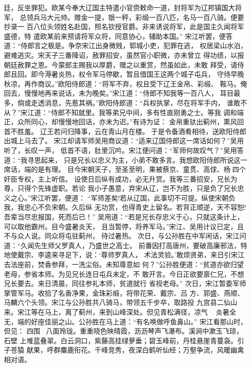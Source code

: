 廷，反坐罪犯。欧某今奉大辽国主特遣小官赍敕命一道，封将军为辽邦镇国大将军，
总领兵马大元帅。赠金一提，银一秤，彩缎一百八匹，名马一百八骑。便要抄录一
百八位头领姓名赴国，照名钦授官爵。非来诱说将军，此是国主久闻将军盛德，特
遣欧某前来预请将军众将，同意协心，辅助本国。”
宋江听罢，便答道：“侍郎言之极是。争奈宋江出身微贱，郓城小吏，犯罪在逃，
权居梁山水泊，避难逃灾。宋天子三番降诏，赦罪招安，虽然官小职微，亦未曾立
得功绩，以报朝廷赦罪之恩。今蒙郎主赐我以厚爵，赠之以重赏，然虽如此，未敢
拜受，请侍郎且回。即今溽暑炎热，权令军马停歇，暂且借国王这两个城子屯兵，
守待早晚秋凉，再作商议。”欧阳侍郎道：“将军不弃，权且受下辽王金帛、彩缎、
鞍马。俺回去，慢慢地再来说话，未为晚矣。”宋江道：“侍郎不知我等一百八人，
耳目最多，倘或走透消息，先惹其祸。”欧阳侍郎道：“兵权执掌，尽在将军手内，
谁敢不从？”宋江道：“侍郎不知就里。我等弟兄中间，多有性直刚勇之士。等我
调和端正，众所同心，却慢慢地回话，亦未为迟。”有诗为证：
金帛重驮出蓟州，熏风回首不胜羞。
辽王若问归降事，云在青山月在楼。
于是令备酒肴相待，送欧阳侍郎出城上马去了。
宋江却请军师吴用商议道：“适来辽国侍郎这一席话如何？”吴用听了，长叹一声，
低首不语，肚里沉吟。宋江便问道：“军师何故叹气？”吴用答道：“我寻思起来，
只是兄长以忠义为主，小弟不敢多言。我想欧阳侍郎所说这一席话，端的是有理。
目今宋朝天子，至圣至明，果被蔡京、童贯、高俅、杨四个奸臣专权，主上听信。
设使日后纵有成功，必无升赏。我等三番招安，兄长为尊，只得个先锋虚职。若论
我小子愚意，弃宋从辽，岂不为胜，只是负了兄长忠义之心。”宋江听罢，便道：
“军师差矣!若从辽国，此事切不可提。纵使宋朝负我，我忠心不负宋朝。久后纵
无功赏，也得青史上留名。若背正顺逆，天不容恕!吾辈当尽忠报国，死而后已！”
吴用道：“若是兄长存忠义于心，只就这条计上，可以取他霸州。目今盛暑炎天，
且当暂停，将养军马。”宋江、吴用计议已定，且不与众人说。同众将屯驻蓟州，
待过暑热。
次日，与公孙胜在中军闲话，宋江问道：“久闻先生师父罗真人，乃盛世之高士。
前番因打高唐州，要破高廉邪法，特地使戴宗、李逵来寻足下，说：‘尊师罗真人，
术法灵验。’敢烦贤弟，来日引宋江去法座前，焚香参拜，一洗尘俗。未知尊意如
何？”公孙胜便道：“贫道亦欲归望老母，参省本师。为见兄长连日屯兵未定，不
敢开言。今日正欲要禀仁兄，不想兄长要去。来日清晨，同往参礼本师，贫道就行
省视老母。”
次日，宋江暂委军师掌管军马。收拾了名香净果，金珠彩缎，将带花荣、戴宗、吕
方、郭盛、燕顺、马麟六个头领。宋江与公孙胜共八骑马，带领五千步卒，取路投
九宫县二仙山来。宋江等在马上，离了蓟州，来到山峰深处。但见青松满径，凉气
，炎暑全无，端的好座佳丽之山。公孙胜在马上道：“有名唤做呼鱼鼻山。”
宋江看那山时，但见：
四围，八面玲珑。重重晓色映晴霞，沥沥琴声飞瀑布。溪涧中漱玉飞琼，石壁
上堆蓝叠翠。白云洞口，紫藤高挂绿萝垂；碧玉峰前，丹桂悬崖青蔓袅。引子苍猿
献果，呼群麋鹿衔花。千峰竞秀，夜深白鹤听仙经；万壑争流，风暖幽禽相对语。
